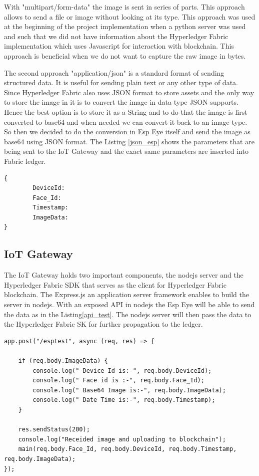 With "multipart/form-data" the image is sent in series of parts. This approach allows to send a file or image without looking at its type. This approach was used at the beginning of the project implementation when a python server was used and such that we did not have information about the Hyperledger Fabric implementation which uses Javascript for interaction with blockchain. This approach is beneficial when we do not want to capture the raw image in bytes. 

The second approach "application/json" is a standard format of sending structured data. It is useful for sending plain text or any other type of data. Since Hyperledger Fabric also uses JSON format to store assets and the only way to store the image in it is to convert the image in data type JSON supports. Hence the best option is to store it as a String and to do that the image is first converted to {\selectfont base64} and when needed we can convert it back to an image type. So then we decided to do the conversion in Esp Eye itself and send the image as {\selectfont base64} using JSON format. 
The Listing \ref{json_esp} shows the parameters that are being sent to the IoT Gateway and the exact same parameters are inserted into Fabric ledger.
\begin{lstlisting}[caption={JSON structure in Esp Eye},label=json_esp, captionpos=b]
{
        DeviceId: 
        Face_Id: 
        Timestamp: 
        ImageData: 
}

\end{lstlisting}


\subsection{IoT Gateway}

The IoT Gateway holds two important components, the nodejs server and the Hyperledger Fabric SDK that serves as the client for Hyperledger Fabric blockchain. The Express.js an application server framework enables to build the server in nodejs. With an exposed API in nodejs the Esp Eye will be able to send the data as in the Listing\ref{api_test}. The nodejs server will then pass the data to the Hyperledger Fabric SK for further propagation to the ledger.



\begin{lstlisting}[caption={The exposed API for handling requests coming from Esp Eye},label=api_test, captionpos=b]
app.post("/esptest", async (req, res) => {

    if (req.body.ImageData) {
        console.log(" Device Id is:-", req.body.DeviceId);
        console.log(" Face id is :-", req.body.Face_Id);
        console.log(" Base64 Image is:-", req.body.ImageData);
        console.log(" Date Time is:-", req.body.Timestamp);
    }

    res.sendStatus(200);
    console.log("Receided image and uploading to blockchain");
    main(req.body.Face_Id, req.body.DeviceId, req.body.Timestamp, req.body.ImageData);
});
\end{lstlisting}



